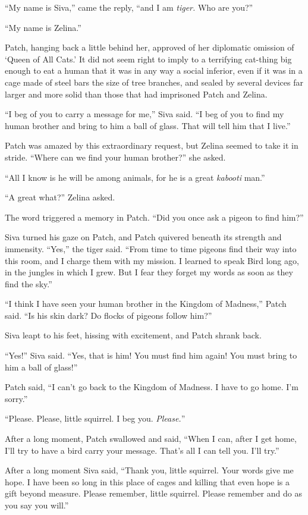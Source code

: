 \documentclass[ebook,oneside,openany,12pt]{memoir}
\begin{document}
“My name is Siva,” came the reply, “and I am \emph{tiger.} Who are
you?”

“My name is Zelina.”

Patch, hanging back a little behind her, approved of her diplomatic
omission of ‘Queen of All Cats.’ It did not seem right to imply to a
terrifying cat-thing big enough to eat a human that it was in any way
a social inferior, even if it was in a cage made of steel bars the
size of tree branches, and sealed by several devices far larger and
more solid than those that had imprisoned Patch and Zelina.

“I beg of you to carry a message for me,” Siva said. “I beg of you to
find my human brother and bring to him a ball of glass. That will tell
him that I live.”

Patch was amazed by this extraordinary request, but Zelina seemed to
take it in stride. “Where can we find your human brother?” she asked.

“All I know is he will be among animals, for he is a great
\emph{kabooti} man.”

“A great what?” Zelina asked.

The word triggered a memory in Patch. “Did you once ask a pigeon to
find him?”

Siva turned his gaze on Patch, and Patch quivered beneath its strength
and immensity. “Yes,” the tiger said. “From time to time pigeons find
their way into this room, and I charge them with my mission. I learned
to speak Bird long ago, in the jungles in which I grew. But I fear
they forget my words as soon as they find the sky.”

“I think I have seen your human brother in the Kingdom of Madness,”
Patch said. “Is his skin dark? Do flocks of pigeons follow him?”

Siva leapt to his feet, hissing with excitement, and Patch shrank
back.

“Yes!” Siva said. “Yes, that is him! You must find him again! You must
bring to him a ball of glass!”

Patch said, “I can’t go back to the Kingdom of Madness. I have to go
home. I’m sorry.”

“Please. Please, little squirrel. I beg you. \emph{Please.}”

After a long moment, Patch swallowed and said, “When I can, after I
get home, I’ll try to have a bird carry your message. That’s all I can
tell you. I’ll try.”

After a long moment Siva said, “Thank you, little squirrel. Your words
give me hope. I have been so long in this place of cages and killing
that even hope is a gift beyond measure. Please remember, little
squirrel. Please remember and do as you say you will.”
\end{document}
